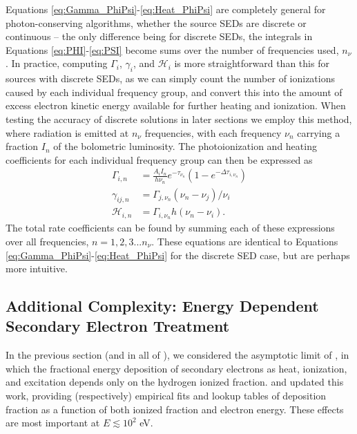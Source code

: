 \documentclass[letterpaper,titlepage,12pt]{article}
\numberwithin{equation}{section}
\newcommand{\Heat}{\mathcal{H}}
\begin{document}
Equations \ref{eq:Gamma_PhiPsi}-\ref{eq:Heat_PhiPsi} are completely general
for photon-conserving algorithms, whether the source SEDs are discrete or
continuous -- the only difference being for discrete SEDs, the integrals in
Equations \ref{eq:PHI}-\ref{eq:PSI} become sums over the number of frequencies
used, $n_{\nu}$. In practice, computing $\Gamma_i$, $\gamma_i$, and $\Heat_i$
is more straightforward than this for sources with discrete SEDs, as we can
simply count the number of ionizations caused by each individual frequency
group, and convert this into the amount of excess electron kinetic energy
available for further heating and ionization. When testing the accuracy of
discrete solutions in later sections we employ this method, where radiation is
emitted at $n_{\nu}$ frequencies, with each frequency $\nu_n$ carrying a
fraction $I_n$ of the bolometric luminosity. The photoionization and heating
coefficients for each individual frequency group can then be expressed as
\begin{align}
    \Gamma_{i,n} & = \frac{A_i I_n}{h \nu_n} e^{-\tau_{\nu_n}}(1 - e^{-\Delta \tau_{i,\nu_n}}) \label{eq:Gamma_simple}\\
    \gamma_{ij,n} & = \Gamma_{j,\nu_n} (\nu_n-\nu_j) / \nu_i \label{eq:gamma_simple} \\
    \Heat_{i,n} & = \Gamma_{i,\nu_n} h(\nu_n - \nu_i) \label{eq:Heat_simple}.
\end{align}    
The total rate coefficients can be found by summing each of these expressions
over all frequencies, $n=1,2,3...n_{\nu}$. These equations are identical to
Equations \ref{eq:Gamma_PhiPsi}-\ref{eq:Heat_PhiPsi} for the discrete SED
case, but are perhaps more intuitive.

\subsection{Additional Complexity: Energy Dependent Secondary Electron Treatment}
In the previous section (and in all of \citet{Mirocha2012}), we considered the asymptotic limit of \citet{Shull1985}, in which the fractional energy deposition of secondary electrons as heat, ionization, and excitation depends only on the hydrogen ionized fraction.  \citet{Ricotti2002} and \citet{Furlanetto2010} updated this work, providing (respectively) empirical fits and lookup tables of deposition fraction as a function of both ionized fraction and electron energy. These effects are most important at $E \lesssim 10^2$ eV.  
\end{document}
